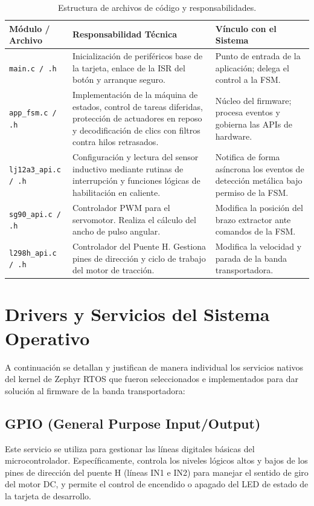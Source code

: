 \documentclass[12pt, letterpaper]{article}
\begin{document}
\begin{table}[H]
\centering
\renewcommand{\arraystretch}{1.2}
\caption{Estructura de archivos de código y responsabilidades.}
\label{tab:arquitectura_software}
\vspace{0.3cm}
\begin{tabularx}{\textwidth}{lXX}
\toprule
\textbf{Módulo / Archivo} & \textbf{Responsabilidad Técnica} & \textbf{Vínculo con el Sistema} \\
\midrule
\texttt{main.c / .h} & Inicialización de periféricos base de la tarjeta, enlace de la ISR del botón y arranque seguro. & Punto de entrada de la aplicación; delega el control a la FSM. \\
\midrule
\texttt{app\_fsm.c / .h} & Implementación de la máquina de estados, control de tareas diferidas, protección de actuadores en reposo y decodificación de clics con filtros contra hilos retrasados. & Núcleo del firmware; procesa eventos y gobierna las APIs de hardware. \\
\midrule
\texttt{lj12a3\_api.c / .h} & Configuración y lectura del sensor inductivo mediante rutinas de interrupción y funciones lógicas de habilitación en caliente. & Notifica de forma asíncrona los eventos de detección metálica bajo permiso de la FSM. \\
\midrule
\texttt{sg90\_api.c / .h} & Controlador PWM para el servomotor. Realiza el cálculo del ancho de pulso angular. & Modifica la posición del brazo extractor ante comandos de la FSM. \\
\midrule
\texttt{l298h\_api.c / .h} & Controlador del Puente H. Gestiona pines de dirección y ciclo de trabajo del motor de tracción. & Modifica la velocidad y parada de la banda transportadora. \\
\bottomrule
\end{tabularx}
\end{table}

\section{Drivers y Servicios del Sistema Operativo}
\label{sec:drivers_servicios}

A continuación se detallan y justifican de manera individual los servicios nativos del kernel de Zephyr RTOS que fueron seleccionados e implementados para dar solución al firmware de la banda transportadora:

\subsection{GPIO (General Purpose Input/Output)}
Este servicio se utiliza para gestionar las líneas digitales básicas del microcontrolador. Específicamente, controla los niveles lógicos altos y bajos de los pines de dirección del puente H (líneas IN1 e IN2) para manejar el sentido de giro del motor DC, y permite el control de encendido o apagado del LED de estado de la tarjeta de desarrollo.
\end{document}
